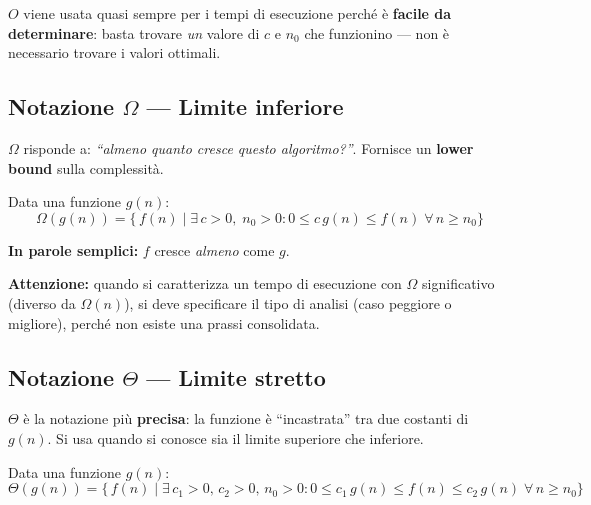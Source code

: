 \begin{hardnote}
	$O$ viene usata quasi sempre per i tempi di esecuzione perché è
	\textbf{facile da determinare}: basta trovare \textit{un} valore
	di $c$ e $n_0$ che funzionino — non è necessario trovare i valori
	ottimali.
\end{hardnote}

\subsection{Notazione \texorpdfstring{$\Omega$}{Omega} — Limite inferiore}

\begin{softnote}
	$\Omega$ risponde a: \textit{``almeno quanto cresce questo
		algoritmo?''}. Fornisce un \textbf{lower bound} sulla complessità.
\end{softnote}

\begin{definizione}
	Data una funzione $g(n)$:
	\[
	\Omega(g(n)) = \bigl\{\,f(n) \mid \exists\,c>0,\;n_0>0 :
	0 \le c\,g(n) \le f(n) \;\forall\,n \ge n_0\bigr\}
	\]
\end{definizione}

\begin{nota}
	\textbf{In parole semplici:} $f$ cresce \textit{almeno} come $g$.
	
	\textbf{Attenzione:} quando si caratterizza un tempo di esecuzione
	con $\Omega$ significativo (diverso da $\Omega(n)$), si deve
	specificare il tipo di analisi (caso peggiore o migliore), perché
	non esiste una prassi consolidata.
\end{nota}

\subsection{Notazione \texorpdfstring{$\Theta$}{Theta} — Limite stretto}

\begin{softnote}
	$\Theta$ è la notazione più \textbf{precisa}: la funzione è
	``incastrata'' tra due costanti di $g(n)$. Si usa quando si
	conosce sia il limite superiore che inferiore.
\end{softnote}

\begin{definizione}[$\Theta$]
	Data una funzione $g(n)$:
	\[
	\Theta(g(n)) = \bigl\{\,f(n) \mid \exists\,c_1>0,\,c_2>0,
	\,n_0>0 : 0 \le c_1\,g(n) \le f(n) \le c_2\,g(n)
	\;\forall\,n \ge n_0\bigr\}
	\]
\end{definizione}

